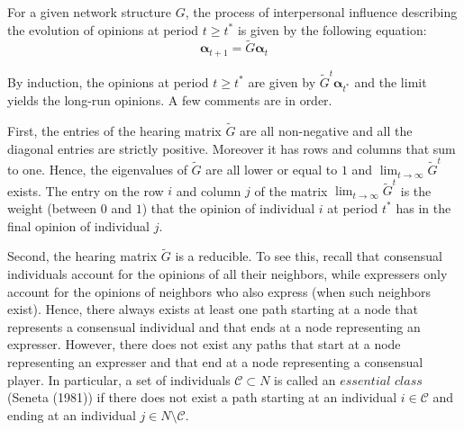\documentclass{article}
\begin{document}

For a given network structure $G$, the process of interpersonal influence describing the evolution of opinions at period $t \geq t^{*}$ is given by the following equation:
\begin{equation}
\mathbf{\alpha}_{t+1} = \tilde{G} \mathbf{\alpha}_{t}
\end{equation}

By induction, the opinions at period $t \geq t^{*}$ are given by $\tilde{G}^t \mathbf{\alpha}_{t^{*}}$ and the limit yields the long-run opinions. A few comments are in order. 

First, the entries of the hearing matrix $\tilde{G}$ are all non-negative and all the diagonal entries are strictly positive. Moreover it has rows and columns that sum to one. Hence, the eigenvalues of $\tilde{G}$ are all lower or equal to $1$ and $\lim_{t \rightarrow \infty } \tilde{G}^t$ exists. The entry on the row $i$ and column $j$ of the matrix $\lim_{t \rightarrow \infty } \tilde{G}^t$ is the weight (between $0$ and $1$) that the opinion of individual $i$ at period $t^{*}$ has in the final opinion of individual $j$. 

Second, the hearing matrix $\tilde{G}$ is a reducible. To see this, recall that consensual individuals account for the opinions of all their neighbors, while expressers only account for the opinions of neighbors who also express (when such neighbors exist). Hence, there always exists at least one path starting at a node that represents a consensual individual and that ends at a node representing an expresser. However, there does not exist any paths that start at a node representing an expresser and that end at a node representing a consensual player. In particular, a set of individuals $\mathcal{C} \subset N$ is called an $essential$ $class$ (Seneta (1981)\cite{seneta}) if there does not exist a path starting at an individual $i \in \mathcal{C}$ and ending at an individual $j \in N \setminus \mathcal{C}$. 
\end{document}
